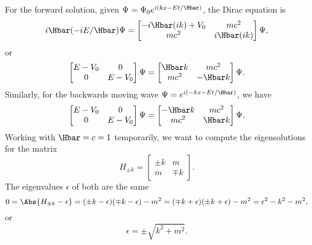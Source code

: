 For the forward solution, given \( \Psi = \Psi_0 e^{i(k x - E t/\Hbar) } \), the Dirac equation is
%
\begin{dmath}\label{eqn:gradQuantumProblemSet4Problem3:20}
i \Hbar (-i E/\Hbar) \Psi =
\begin{bmatrix}
-i \Hbar (i k) + V_0 & m c^2 \\
m c^2 & i \Hbar (i k)
\end{bmatrix}
\Psi,
\end{dmath}
or
\begin{dmath}\label{eqn:gradQuantumProblemSet4Problem3:40}
\begin{bmatrix}
E - V_0 & 0 \\
0 & E - V_0
\end{bmatrix}
\Psi
=
\begin{bmatrix}
\Hbar k & m c^2 \\
m c^2 &  - \Hbar k
\end{bmatrix}
\Psi.
\end{dmath}
%
Similarly, for the backwards moving wave \( \Psi = e^{i(-k x - E t/\Hbar)} \), we have
%
\begin{dmath}\label{eqn:gradQuantumProblemSet4Problem3:60}
\begin{bmatrix}
E - V_0 & 0 \\
0 & E - V_0
\end{bmatrix}
\Psi
=
\begin{bmatrix}
-\Hbar k & m c^2 \\
m c^2 & \Hbar k
\end{bmatrix}
\Psi.
\end{dmath}
%
Working with \( \Hbar = c = 1 \) temporarily, we want to compute the eigensolutions for the matrix
%
\begin{dmath}\label{eqn:gradQuantumProblemSet4Problem3:80}
H_{\pm k}
=
\begin{bmatrix}
\pm k & m \\
m & \mp k
\end{bmatrix}.
\end{dmath}
%
The eigenvalues \( \epsilon \) of both are the same
%
\begin{dmath}\label{eqn:gradQuantumProblemSet4Problem3:100}
0
=
\Abs{ H_{\pm k} - \epsilon }
=
(\pm k - \epsilon)(\mp k - \epsilon) - m^2
=
(\mp k + \epsilon)(\pm k + \epsilon) - m^2
=
\epsilon^2 - k^2 - m^2,
\end{dmath}
%
or
%
\begin{dmath}\label{eqn:gradQuantumProblemSet4Problem3:120}
\epsilon = \pm \sqrt{k^2 + m^2}.
\end{dmath}
%
